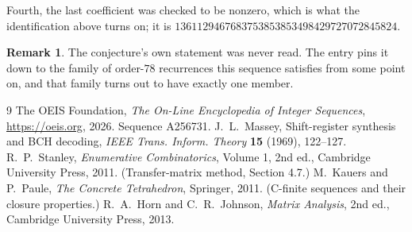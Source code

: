 \documentclass[11pt,a4paper]{article}
\theoremstyle{plain}
\theoremstyle{definition}
\newtheorem{remark}[theorem]{Remark}
\begin{document}
Fourth, the last coefficient was checked to be nonzero, which is what the identification above
turns on; it is $1361129467683753853853498429727072845824$.

\begin{remark}
The conjecture's own statement was never read. The entry pins it down to the family of
order-$78$ recurrences this sequence satisfies from some point on, and that family turns
out to have exactly one member.
\end{remark}

\begin{thebibliography}{9}
 The OEIS Foundation, \emph{The On-Line Encyclopedia of Integer
Sequences}, \url{https://oeis.org}, 2026. Sequence A256731.
 J.~L.~Massey, Shift-register synthesis and BCH decoding, \emph{IEEE
Trans. Inform. Theory} \textbf{15} (1969), 122--127.
 R.~P.~Stanley, \emph{Enumerative Combinatorics}, Volume 1, 2nd ed.,
Cambridge University Press, 2011. (Transfer-matrix method, Section 4.7.)
 M.~Kauers and P.~Paule, \emph{The Concrete Tetrahedron}, Springer, 2011.
(C-finite sequences and their closure properties.)
 R.~A.~Horn and C.~R.~Johnson, \emph{Matrix Analysis}, 2nd ed., Cambridge
University Press, 2013.
\end{thebibliography}
\end{document}
